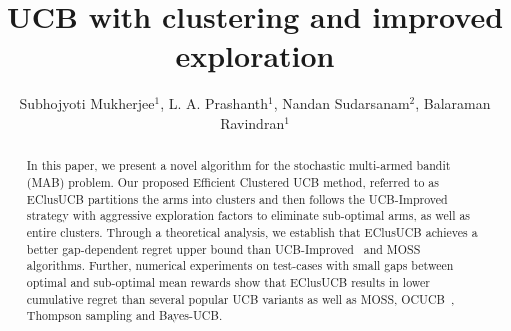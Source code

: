 \documentclass{llncs}
\begin{document}
%
\frontmatter          %
%
\pagestyle{headings}  %

\mainmatter              %
%
\title{UCB with clustering and improved exploration}
%
%
\author{Subhojyoti Mukherjee${}^1$, L. A. Prashanth${}^1$, Nandan
Sudarsanam${}^2$, Balaraman Ravindran${}^1$}
%
%
%

\maketitle              %

\begin{abstract}
In this paper, we present a novel algorithm for the stochastic multi-armed bandit (MAB) problem. Our proposed Efficient Clustered UCB method, referred to as EClusUCB partitions the arms into clusters and then follows the UCB-Improved strategy with aggressive exploration factors to eliminate sub-optimal arms, as well as entire clusters. Through a theoretical analysis, we establish that EClusUCB achieves a better gap-dependent regret upper bound than UCB-Improved~\cite{auer2010ucb} and MOSS~\cite{audibert2009minimax} algorithms. Further, numerical experiments on test-cases with small gaps between optimal and sub-optimal mean rewards show that EClusUCB results in lower cumulative regret than several popular UCB variants as well as MOSS, OCUCB~\cite{lattimore2015optimally}, Thompson sampling and Bayes-UCB\cite{kaufmann2012bayesian}. 

\end{abstract}
\end{document}
